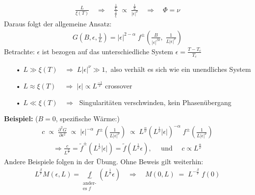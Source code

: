 \documentclass[12pt]{article}
\begin{document}
\begin{align}
\frac{L}{\xi(T)} \quad \Rightarrow \quad \frac{\frac{1}{L}}{\frac{1}{\xi}} \; \propto \;  \frac{\frac{1}{L}}{\vert \epsilon \vert ^\nu} \quad \Rightarrow \quad \Phi = \nu
\end{align} Daraus folgt der allgemeine Ansatz:
\begin{align}
G(B, \epsilon, \frac{1}{L}) = \vert \epsilon \vert^{2-\alpha} \;  f^\pm \left( \frac{B}{\vert \epsilon \vert ^{\beta \delta}} ,\; \frac{1}{L \vert \epsilon \vert^\nu}\right) 
\end{align}
Betrachte: $\epsilon$ ist bezogen auf das unterschiedliche System $ \epsilon = \frac{T-T_c}{T_c}$ 
\begin{itemize}
\item[•] $L \gg \xi (T) \quad \Rightarrow \; L \vert \epsilon \vert ^\nu \gg  1,$ also verhält es sich wie ein unendliches System
\item[•] $ L \approx \xi (T) \quad \, \Rightarrow \; \vert \epsilon \vert \propto L^\frac{-1}{\nu}$ crossover 
\item[•]$L\ll \xi(T) \quad \Rightarrow \;$ Singularitäten verschwinden, kein Phasenübergang

\end{itemize}
\textbf{Beispiel:} ($B=0$, spezifische Wärme:) 
\begin{align*}
c \; \propto \;  \frac{\partial^2 G}{\partial \epsilon^2} \; \propto \; \vert \epsilon \vert^{-\alpha} \;  f^\pm \left( \frac{1}{L \vert \epsilon \vert^\nu}\right) 
\; \propto \;  L^\frac{\alpha}{\nu} (L^\frac{1}{\nu} \vert \epsilon \vert)^{-\alpha} \; f^\pm \left( \frac{1}{L \vert \epsilon \vert ^\nu }\right) 
\end{align*}
\begin{align*}
\Rightarrow \frac{c}{L^\frac{\alpha}{\nu}} = \tilde{f}^\pm \left( L^\frac{1}{\nu} \vert \epsilon \vert \right) = \tilde{f} \left( L^\frac{1}{\nu} \epsilon \right), \quad \mbox{ und } \quad c \propto L^\frac{\alpha}{\nu} \tag{bei $T_c$}
\end{align*} 
Andere Beispiele folgen in der Übung. 
Ohne Beweis gilt weiterhin: 
\begin{align*}
L^\frac{\beta}{\nu} M(\epsilon,L)=\underbrace{f}_{\substack{\text{ander-} \\ \text{es $f$}}}(L^\frac{1}{\nu} \epsilon) \quad \Rightarrow \quad M(0,L) \; = \; L^{-\frac{\beta}{\nu}} \; f(0)
\end{align*}
\end{document}

